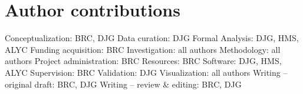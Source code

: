 \documentclass[9pt,biorxiv,lineno,onehalfspacing]{lapreprint}
\begin{document}
\section{Author contributions}


Conceptualization: BRC, DJG\newline
Data curation: DJG\newline
Formal Analysis: DJG, HMS, ALYC\newline
Funding acquisition: BRC\newline
Investigation: all authors\newline
Methodology: all authors\newline
Project administration: BRC\newline
Resources: BRC\newline
Software: DJG, HMS, ALYC\newline
Supervision: BRC\newline
Validation: DJG\newline
Visualization: all authors\newline
Writing – original draft: BRC, DJG\newline
Writing – review \& editing: BRC, DJG\newline



\newcommand{\supplementarysection}{%
  \setcounter{figure}{0}%
  \let\oldthefigure\thefigure%
  \renewcommand{\thefigure}{S\oldthefigure}%
}

\supplementarysection
\end{document}
